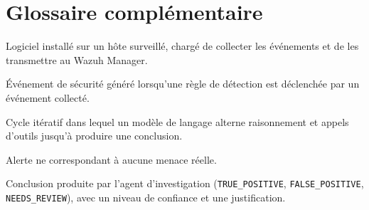 \section{Glossaire complémentaire}

\begin{description}[leftmargin=3.4cm]
  \item[Agent (Wazuh)] Logiciel installé sur un hôte surveillé, chargé de
    collecter les événements et de les transmettre au Wazuh Manager.
  \item[Alerte] Événement de sécurité généré lorsqu'une règle de détection
    est déclenchée par un événement collecté.
  \item[Boucle agentique] Cycle itératif dans lequel un modèle de langage
    alterne raisonnement et appels d'outils jusqu'à produire une conclusion.
  \item[Faux positif] Alerte ne correspondant à aucune menace réelle.
  \item[Verdict] Conclusion produite par l'agent d'investigation
    (\texttt{TRUE\_POSITIVE}, \texttt{FALSE\_POSITIVE},
    \texttt{NEEDS\_REVIEW}), avec un niveau de confiance et une
    justification.
\end{description}
